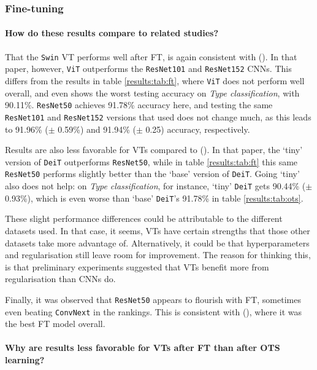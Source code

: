 \subsubsection{Fine-tuning} \label{exp:int:ft}

\paragraph{How do these results compare to related studies?}
That the \texttt{Swin} VT performs well after FT, is again consistent with \citeauthor{zhou2021convnets} (\citeyear{zhou2021convnets}). In that paper, however, \texttt{ViT} outperforms the \texttt{ResNet101} and \texttt{ResNet152} CNNs. This differs from the results in table \ref{results:tab:ft}, where \texttt{ViT} does not perform well overall, and even shows the worst testing accuracy on \textit{Type classification}, with 90.11\%. \texttt{ResNet50} achieves 91.78\% accuracy here, and testing the same \texttt{ResNet101} and \texttt{ResNet152} versions that \citeauthor{zhou2021convnets} used does not change much, as this leads to 91.96\% ($\pm$ 0.59\%) and 91.94\% ($\pm$ 0.25) accuracy, respectively.

Results are also less favorable for VTs compared to \citeauthor{matsoukas2021time} (\citeyear{matsoukas2021time}). In that paper, the `tiny' version of \texttt{DeiT} outperforms \texttt{ResNet50}, while in table \ref{results:tab:ft} this same \texttt{ResNet50} performs slightly better than the `base' version of \texttt{DeiT}. Going `tiny' also does not help: on \textit{Type classification}, for instance, `tiny' \texttt{DeiT} gets 90.44\% ($\pm$ 0.93\%), which is even worse than `base' \texttt{DeiT}'s 91.78\% in table \ref{results:tab:ots}.

These slight performance differences could be attributable to the different datasets used. In that case, it seems, VTs have certain strengths that those other datasets take more advantage of. Alternatively, it could be that hyperparameters and regularisation still leave room for improvement. The reason for thinking this, is that preliminary experiments suggested that VTs benefit more from regularisation than CNNs do.

Finally, it was observed that \texttt{ResNet50} appears to flourish with FT, sometimes even beating \texttt{Conv\-Next} in the rankings. This is consistent with \citeauthor{sabatelli2018deep} (\citeyear{sabatelli2018deep}), where it was the best FT model overall.

\paragraph{Why are results less favorable for VTs after FT than after OTS learning?}

